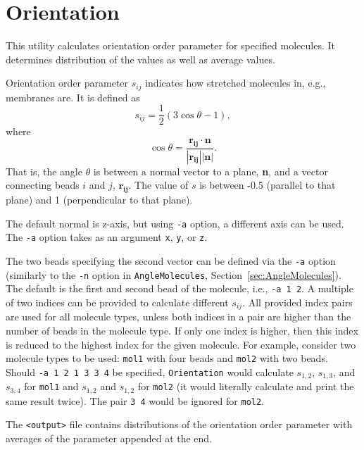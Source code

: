 \section{Orientation} \label{sec:Orientation}

This utility calculates orientation order parameter for specified
molecules. It determines distribution of the values as well as average values.

Orientation order parameter $s_{ij}$ indicates how stretched molecules in,
e.g., membranes are. It is defined as
\begin{equation} \label{eq:Orient}
  s_{ij} = \frac{1}{2} \left(3 \cos \theta - 1 \right),
\end{equation}
where
\begin{equation} \label{eq:Cos}
  \cos \theta =
  \frac{\mathbf{r_{ij}\cdot\mathbf{n}}}{|\mathbf{r_{ij}}||\mathbf{n}|}.
\end{equation}
That is, the angle $\theta$ is between a normal vector to a plane,
\textbf{n}, and a vector connecting beads $i$ and $j$, $\mathbf{r_{ij}}$.
The value of $s$ is between -0.5 (parallel to that plane) and 1
(perpendicular to that plane).

The default normal is z-axis, but using \texttt{-a} option, a different
axis can be used. The \texttt{-a} option takes as an argument \texttt{x},
\texttt{y}, or \texttt{z}.

The two beads specifying the second vector can be defined via the
\texttt{-a} option (similarly to the \texttt{-n} option in
\texttt{AngleMolecules}, Section~\ref{sec:AngleMolecules}).  The default is
the first and second bead of the molecule, i.e., \texttt{-a 1 2}.  A
multiple of two indices can be provided to calculate different $s_{ij}$.
All provided index pairs are used for all molecule types, unless both
indices in a pair are higher than the number of beads in the molecule type.
If only one index is higher, then this index is reduced to the highest
index for the given molecule. For example, consider two molecule types to
be used: \texttt{mol1} with four beads and \texttt{mol2} with two beads.
Should \texttt{-a 1 2 1 3 3 4} be specified, \texttt{Orientation} would
calculate $s_{1,2}$, $s_{1,3}$, and $s_{3,4}$ for \texttt{mol1} and
$s_{1,2}$ and $s_{1,2}$ for \texttt{mol2} (it would literally calculate and
print the same result twice). The pair \texttt{3 4} would be ignored for
\texttt{mol2}.

The \texttt{<output>} file contains distributions of the orientation order
parameter with averages of the parameter appended at the end.

